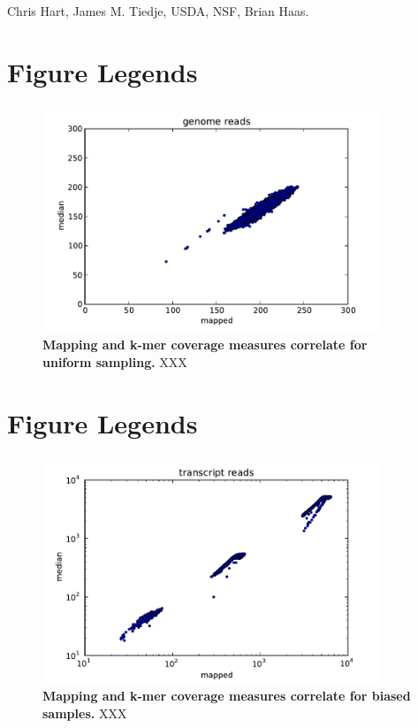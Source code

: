 \documentclass[10pt,draft]{article}
\begin{document}
Chris Hart, James M. Tiedje, USDA, NSF, Brian Haas.



\section*{Figure Legends}
\begin{figure}[!ht]
\begin{center}
\includegraphics[width=4in]{diginorm-fig1a.pdf}
\end{center}
\caption{
{\bf Mapping and k-mer coverage measures correlate for uniform sampling.}
XXX
}
\label{fig:random}
\end{figure}

\section*{Figure Legends}
\begin{figure}[!ht]
\begin{center}
\includegraphics[width=4in]{diginorm-fig2a.pdf}
\end{center}
\caption{
{\bf Mapping and k-mer coverage measures correlate for biased samples.}
XXX
}
\label{fig:transcripts}
\end{figure}
\end{document}

